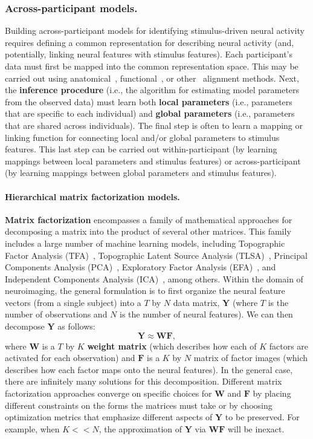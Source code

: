 \documentclass{llmxive}
\begin{document}
\subsubsection{Across-participant models.}
Building across-participant models for identifying stimulus-driven
neural activity requires defining a common representation for
describing neural activity (and, potentially, linking neural features
with stimulus features).  Each participant's data must first be mapped
into the common representation space.  This may be carried out using
anatomical~\citep{HermEtal10, ArchEtal07, StudEtal00},
functional~\citep{HaxbEtal11, ChenEtal21, XieEtal21, HaxbEtal20}, or
other~\citep{SabuEtal10, SekiEtal02} alignment methods.  Next, the
\textbf{inference procedure} (i.e., the algorithm for estimating model
parameters from the observed data) must learn both \textbf{local
  parameters} (i.e., parameters that are specific to each individual)
and \textbf{global parameters} (i.e., parameters that are shared
across individuals).  The final step is often to learn a mapping or
linking function for connecting local and/or global parameters to
stimulus features.  This last step can be carried out
within-participant (by learning mappings between local parameters and
stimulus features) or across-participant (by learning mappings between
global parameters and stimulus features).

\paragraph{Hierarchical matrix factorization models.}
\textbf{Matrix factorization} encompasses a family of mathematical
approaches for decomposing a matrix into the product of several other
matrices.  This family includes a large number of machine learning
models, including Topographic Factor Analysis (TFA)~\cite{MannEtal14b,
  MannEtal18}, Topographic Latent Source Analysis
(TLSA)~\cite{GersEtal11}, Principal Components Analysis
(PCA)~\cite{Pear01}, Exploratory Factor Analysis (EFA)~\cite{Spea04},
and Independent Components Analysis (ICA)~\cite{JuttHera91,
  ComoEtal91}, among others.  Within the domain of neuroimaging, the
general formulation is to first organize the neural feature vectors
(from a single subject) into a $T$ by $N$ data matrix, $\mathbf{Y}$
(where $T$ is the number of observations and $N$ is the number of
neural features).  We can then decompose $\mathbf{Y}$ as follows:
\[
  \mathbf{Y} \approx \mathbf{W}\mathbf{F},
  \]
  where $\mathbf{W}$ is a $T$ by $K$ \textbf{weight matrix} (which
  describes how each of $K$ factors are activated for each
  observation) and $\mathbf{F}$ is a $K$ by $N$ matrix of factor
  images (which describes how each factor maps onto the neural
  features).  In the general case, there are infinitely many solutions
  for this decomposition.  Different matrix factorization approaches
  converge on specific choices for $\mathbf{W}$ and $\mathbf{F}$ by
  placing different constraints on the forms the matrices must take or
  by choosing optimization metrics that emphasize different aspects of
  $\mathbf{Y}$ to be preserved.  For example, when $K << N$, the
  approximation of $\mathbf{Y}$ via $\mathbf{W}\mathbf{F}$ will be
  inexact.
  
\end{document}
